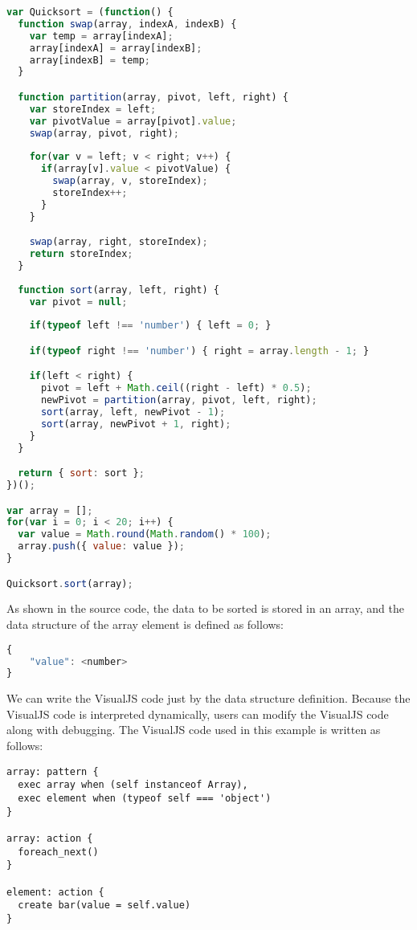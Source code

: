 \begin{lstlisting}[language=JavaScript]
var Quicksort = (function() {
  function swap(array, indexA, indexB) {
    var temp = array[indexA];
    array[indexA] = array[indexB];
    array[indexB] = temp;
  }

  function partition(array, pivot, left, right) {
    var storeIndex = left;
    var pivotValue = array[pivot].value;
    swap(array, pivot, right);
 
    for(var v = left; v < right; v++) {
      if(array[v].value < pivotValue) {
        swap(array, v, storeIndex);
        storeIndex++;
      }
    }

    swap(array, right, storeIndex);
    return storeIndex;
  }
 
  function sort(array, left, right) {
    var pivot = null;
 
    if(typeof left !== 'number') { left = 0; }

    if(typeof right !== 'number') { right = array.length - 1; }

    if(left < right) {
      pivot = left + Math.ceil((right - left) * 0.5);
      newPivot = partition(array, pivot, left, right);
      sort(array, left, newPivot - 1);
      sort(array, newPivot + 1, right);
    }
  }

  return { sort: sort };
})();

var array = [];
for(var i = 0; i < 20; i++) {
  var value = Math.round(Math.random() * 100);
  array.push({ value: value });
}

Quicksort.sort(array);
\end{lstlisting}

As shown in the source code, the data to be sorted is stored in an array, and the data structure of the array element is defined as follows:

\begin{lstlisting}[language=JavaScript]
{
	"value": <number>
}
\end{lstlisting}

We can write the VisualJS code just by the data structure definition. Because the VisualJS code is interpreted dynamically, users can modify the VisualJS code along with debugging. The VisualJS code used in this example is written as follows:

\begin{lstlisting}
array: pattern {
  exec array when (self instanceof Array),
  exec element when (typeof self === 'object')
}

array: action {
  foreach_next()
}

element: action {
  create bar(value = self.value)
}
\end{lstlisting}

